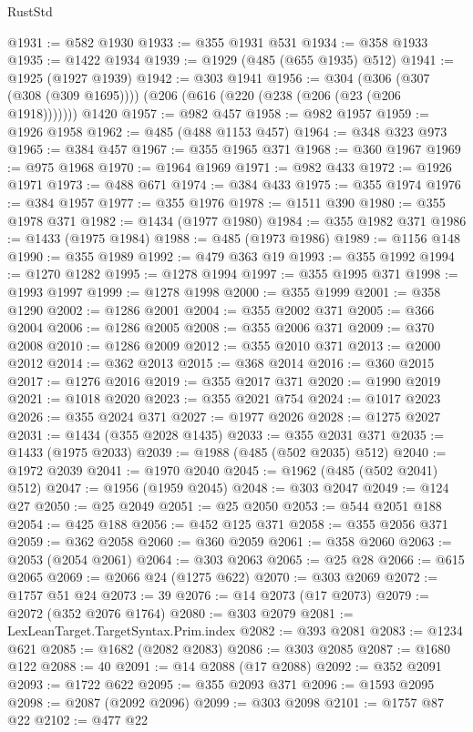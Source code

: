 \begin{lexlean}{RustStd}
\begin{coremodule}
@1931 := @582 @1930
@1933 := @355 @1931 @531
@1934 := @358 @1933
@1935 := @1422 @1934
@1939 := @1929 (@485 (@655 @1935) @512)
@1941 := @1925 (@1927 @1939)
@1942 := @303 @1941
@1956 := @304
    (@306 (@307 (@308 (@309 @1695))))
    (@206 (@616 (@220 (@238 (@206 (@23 (@206 @1918)))))))
    @1420
@1957 := @982 @457
@1958 := @982 @1957
@1959 := @1926 @1958
@1962 := @485 (@488 @1153 @457)
@1964 := @348 @323 @973
@1965 := @384 @457
@1967 := @355 @1965 @371
@1968 := @360 @1967
@1969 := @975 @1968
@1970 := @1964 @1969
@1971 := @982 @433
@1972 := @1926 @1971
@1973 := @488 @671
@1974 := @384 @433
@1975 := @355 @1974
@1976 := @384 @1957
@1977 := @355 @1976
@1978 := @1511 @390
@1980 := @355 @1978 @371
@1982 := @1434 (@1977 @1980)
@1984 := @355 @1982 @371
@1986 := @1433 (@1975 @1984)
@1988 := @485 (@1973 @1986)
@1989 := @1156 @148
@1990 := @355 @1989
@1992 := @479 @363 @19
@1993 := @355 @1992
@1994 := @1270 @1282
@1995 := @1278 @1994
@1997 := @355 @1995 @371
@1998 := @1993 @1997
@1999 := @1278 @1998
@2000 := @355 @1999
@2001 := @358 @1290
@2002 := @1286 @2001
@2004 := @355 @2002 @371
@2005 := @366 @2004
@2006 := @1286 @2005
@2008 := @355 @2006 @371
@2009 := @370 @2008
@2010 := @1286 @2009
@2012 := @355 @2010 @371
@2013 := @2000 @2012
@2014 := @362 @2013
@2015 := @368 @2014
@2016 := @360 @2015
@2017 := @1276 @2016
@2019 := @355 @2017 @371
@2020 := @1990 @2019
@2021 := @1018 @2020
@2023 := @355 @2021 @754
@2024 := @1017 @2023
@2026 := @355 @2024 @371
@2027 := @1977 @2026
@2028 := @1275 @2027
@2031 := @1434 (@355 @2028 @1435)
@2033 := @355 @2031 @371
@2035 := @1433 (@1975 @2033)
@2039 := @1988 (@485 (@502 @2035) @512)
@2040 := @1972 @2039
@2041 := @1970 @2040
@2045 := @1962 (@485 (@502 @2041) @512)
@2047 := @1956 (@1959 @2045)
@2048 := @303 @2047
@2049 := @124 @27
@2050 := @25 @2049
@2051 := @25 @2050
@2053 := @544 @2051 @188
@2054 := @425 @188
@2056 := @452 @125 @371
@2058 := @355 @2056 @371
@2059 := @362 @2058
@2060 := @360 @2059
@2061 := @358 @2060
@2063 := @2053 (@2054 @2061)
@2064 := @303 @2063
@2065 := @25 @28
@2066 := @615 @2065
@2069 := @2066 @24 (@1275 @622)
@2070 := @303 @2069
@2072 := @1757 @51 @24
@2073 := 39
@2076 := @14 @2073 (@17 @2073)
@2079 := @2072 (@352 @2076 @1764)
@2080 := @303 @2079
@2081 := LexLeanTarget.TargetSyntax.Prim.index
@2082 := @393 @2081
@2083 := @1234 @621
@2085 := @1682 (@2082 @2083)
@2086 := @303 @2085
@2087 := @1680 @122
@2088 := 40
@2091 := @14 @2088 (@17 @2088)
@2092 := @352 @2091
@2093 := @1722 @622
@2095 := @355 @2093 @371
@2096 := @1593 @2095
@2098 := @2087 (@2092 @2096)
@2099 := @303 @2098
@2101 := @1757 @87 @22
@2102 := @477 @22

\end{coremodule}
\end{lexlean}
